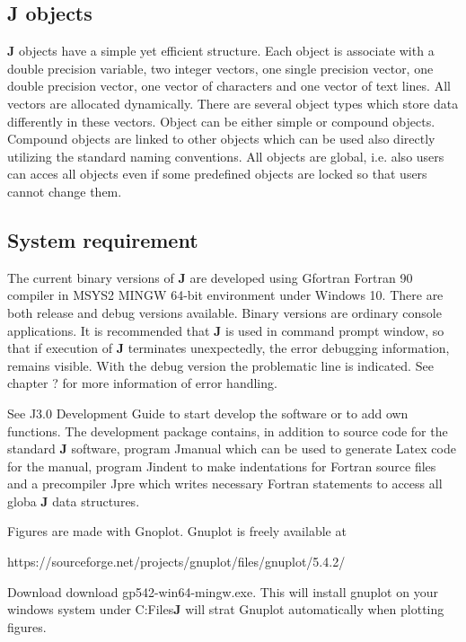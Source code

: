 \subsection{\textbf{J} objects}
\label{objintro}
\textbf{J} objects have a simple yet efficient structure. Each object is associate with a double precision
variable, two integer vectors, one single precision vector, one double precision vector,
one vector of characters and one vector of text lines. All vectors are allocated dynamically.
There are several object types which store data differently in these vectors.
Object can be either simple or compound objects. Compound objects are linked to other
objects which can be used also directly utilizing the standard naming conventions. All objects are
global, i.e. also users can acces all objects even if some predefined objects are locked so that
users cannot change them.

\subsection{System requirement}
\label{system}
The current binary versions of \textbf{J} are developed using Gfortran Fortran 90 compiler in MSYS2 MINGW 64-bit environment
under Windows 10. There are both release and debug versions available.
Binary versions are ordinary console applications. It is recommended that \textbf{J} is used in command
prompt window, so that
if execution of \textbf{J} terminates unexpectedly, the error debugging information, remains visible.
With the debug version the problematic line is indicated.
See chapter ? for more information of error handling.

See J3.0 Development Guide to start develop the software or to add
own functions. The development package contains, in addition to source code for
the standard \textbf{J} software, program Jmanual
which can be used to generate Latex code for the manual, program Jindent to make indentations for
Fortran source files and
a precompiler Jpre which writes necessary Fortran statements to access all globa \textbf{J} data structures.

Figures are made with Gnoplot.
Gnuplot is freely available at


https://sourceforge.net/projects/gnuplot/files/gnuplot/5.4.2/

Download  download gp542-win64-mingw.exe. This will install gnuplot on your windows
system under C:\Program Files\gnuplot\. \textbf{J} will strat Gnuplot automatically when
plotting figures.

